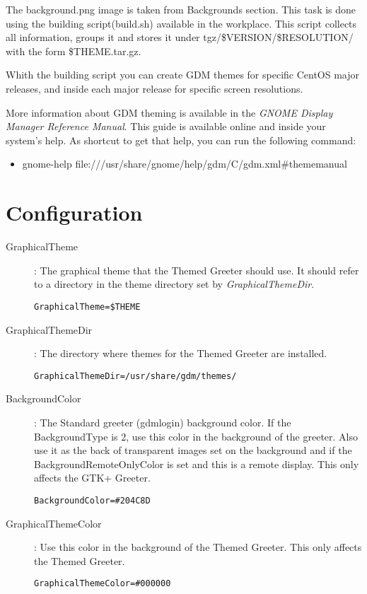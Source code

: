 \documentclass{article}
\begin{document}
The background.png image is taken from Backgrounds section. This task
is done using the building script(build.sh) available in the
workplace. This script collects all information, groups it and stores
it under tgz/\$VERSION/\$RESOLUTION/ with the form \$THEME.tar.gz.

Whith the building script you can create GDM themes for specific
CentOS major releases, and inside each major release for specific
screen resolutions.

More information about GDM theming is available in the \emph{GNOME
Display Manager Reference Manual}. This guide is available online and
inside your system's help. As shortcut to get that help, you can run
the following command:

\begin{itemize}
\item gnome-help file:///usr/share/gnome/help/gdm/C/gdm.xml\#thememanual
\end{itemize}

\section{Configuration}

\begin{description}

\item[GraphicalTheme]: The graphical theme that the Themed Greeter
should use.  It should refer to a directory in the theme directory set
by \emph{GraphicalThemeDir}.

\texttt{GraphicalTheme=\$THEME}\\
                                              
\item[GraphicalThemeDir]: The directory where themes for the Themed
Greeter are installed.

\texttt{GraphicalThemeDir=/usr/share/gdm/themes/}

\item[BackgroundColor]: The Standard greeter (gdmlogin) background
color. If the BackgroundType is 2, use this color in the background of
the greeter.  Also use it as the back of transparent images set on the
background and if the BackgroundRemoteOnlyColor is set and this is a
remote display.  This only affects the GTK+ Greeter.

\texttt{BackgroundColor=\#204C8D}

\item[GraphicalThemeColor]: Use this color in the background of the
Themed Greeter. This only affects the Themed Greeter.

\texttt{GraphicalThemeColor=\#000000}

\end{description}
\end{document}
